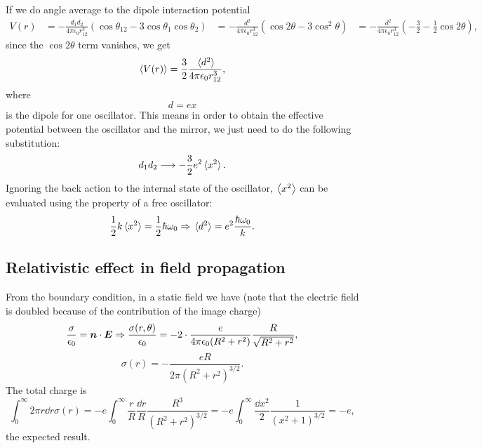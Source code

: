 \documentclass[hyperref, a4paper]{article}
\def\\{}%
\begin{document}
If we do angle average to the dipole interaction potential
\begin{equation}
    \begin{aligned}
        V(r) &= -\frac{d_1 d_2}{4 \pi \epsilon_0 r_{12}^3}\left(\cos \theta_{12}-3 \cos \theta_1 \cos \theta_2\right) \\
        &= -\frac{d^2}{4 \pi \epsilon_0 r_{12}^3} (\cos 2 \theta - 3 \cos^2 \theta) \\
        &= -\frac{d^2}{4 \pi \epsilon_0 r_{12}^3} \left(
            - \frac{3}{2} - \frac{1}{2} \cos 2 \theta
        \right),
    \end{aligned}
\end{equation}
since the $\cos 2 \theta$ term vanishes, we get 
\begin{equation}
    \expval{V(r)} = \frac{3}{2} \frac{\expval*{d^2}}{4 \pi \epsilon_0 r_{12}^3} ,
\end{equation}
where 
\begin{equation}
    d = e x 
\end{equation}
is the dipole for one oscillator.
This means in order to obtain the effective potential 
between the oscillator and the mirror, 
we just need to do the following substitution:
\begin{equation}
    d_1 d_2 \longrightarrow - \frac{3}{2} e^2 \expval*{x^2}.
\end{equation}
Ignoring the back action to the internal state of the oscillator,
$\expval{x^2}$ can be evaluated using the property of a free oscillator:
\begin{equation}
    \frac{1}{2} k \expval*{x^2} = \frac{1}{2} \hbar \omega_0
    \Rightarrow \expval*{d^2} = e^2 \frac{\hbar \omega_0}{k}.
\end{equation}

\subsection{Relativistic effect in field propagation}

From the boundary condition, 
in a static field we have 
(note that the electric field is doubled 
because of the contribution of the image charge)
\begin{equation}
    \frac{\sigma}{\epsilon_0} = \vb*{n} \cdot \vb*{E} \Rightarrow
    \frac{\sigma(r, \theta)}{\epsilon_0} = - 2 \cdot \frac{e}{4\pi \epsilon_0 (R^2 + r^2)} \frac{R}{\sqrt{R^2 + r^2}}, 
\end{equation}
\begin{equation}
    \sigma(r) = - \frac{e R}{2 \pi (R^2 + r^2)^{3/2}} .
\end{equation}
The total charge is 
\begin{equation}
    \int_{0}^{\infty} 2\pi r \dd{r} \sigma(r)
    = - e \int_{0}^{\infty} \frac{r}{R} \frac{\dd{r}}{R} \frac{R^3}{(R^2 + r^2)^{3/2}}
    = - e \int_{0}^{\infty} \frac{\dd{x^2}}{2} \frac{1}{(x^2 + 1)^{3/2}} \\
    = - e ,
\end{equation}
the expected result.
\end{document}
